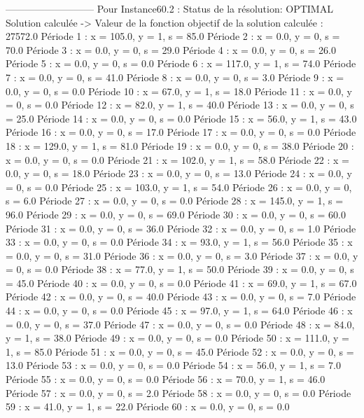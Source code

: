 ---------------------------
Pour Instance60.2  :
Status de la résolution: OPTIMAL
Solution calculée
-> Valeur de la fonction objectif de la solution calculée :  27572.0
Période 1 : x = 105.0, y = 1, s = 85.0
Période 2 : x = 0.0, y = 0, s = 70.0
Période 3 : x = 0.0, y = 0, s = 29.0
Période 4 : x = 0.0, y = 0, s = 26.0
Période 5 : x = 0.0, y = 0, s = 0.0
Période 6 : x = 117.0, y = 1, s = 74.0
Période 7 : x = 0.0, y = 0, s = 41.0
Période 8 : x = 0.0, y = 0, s = 3.0
Période 9 : x = 0.0, y = 0, s = 0.0
Période 10 : x = 67.0, y = 1, s = 18.0
Période 11 : x = 0.0, y = 0, s = 0.0
Période 12 : x = 82.0, y = 1, s = 40.0
Période 13 : x = 0.0, y = 0, s = 25.0
Période 14 : x = 0.0, y = 0, s = 0.0
Période 15 : x = 56.0, y = 1, s = 43.0
Période 16 : x = 0.0, y = 0, s = 17.0
Période 17 : x = 0.0, y = 0, s = 0.0
Période 18 : x = 129.0, y = 1, s = 81.0
Période 19 : x = 0.0, y = 0, s = 38.0
Période 20 : x = 0.0, y = 0, s = 0.0
Période 21 : x = 102.0, y = 1, s = 58.0
Période 22 : x = 0.0, y = 0, s = 18.0
Période 23 : x = 0.0, y = 0, s = 13.0
Période 24 : x = 0.0, y = 0, s = 0.0
Période 25 : x = 103.0, y = 1, s = 54.0
Période 26 : x = 0.0, y = 0, s = 6.0
Période 27 : x = 0.0, y = 0, s = 0.0
Période 28 : x = 145.0, y = 1, s = 96.0
Période 29 : x = 0.0, y = 0, s = 69.0
Période 30 : x = 0.0, y = 0, s = 60.0
Période 31 : x = 0.0, y = 0, s = 36.0
Période 32 : x = 0.0, y = 0, s = 1.0
Période 33 : x = 0.0, y = 0, s = 0.0
Période 34 : x = 93.0, y = 1, s = 56.0
Période 35 : x = 0.0, y = 0, s = 31.0
Période 36 : x = 0.0, y = 0, s = 3.0
Période 37 : x = 0.0, y = 0, s = 0.0
Période 38 : x = 77.0, y = 1, s = 50.0
Période 39 : x = 0.0, y = 0, s = 45.0
Période 40 : x = 0.0, y = 0, s = 0.0
Période 41 : x = 69.0, y = 1, s = 67.0
Période 42 : x = 0.0, y = 0, s = 40.0
Période 43 : x = 0.0, y = 0, s = 7.0
Période 44 : x = 0.0, y = 0, s = 0.0
Période 45 : x = 97.0, y = 1, s = 64.0
Période 46 : x = 0.0, y = 0, s = 37.0
Période 47 : x = 0.0, y = 0, s = 0.0
Période 48 : x = 84.0, y = 1, s = 38.0
Période 49 : x = 0.0, y = 0, s = 0.0
Période 50 : x = 111.0, y = 1, s = 85.0
Période 51 : x = 0.0, y = 0, s = 45.0
Période 52 : x = 0.0, y = 0, s = 13.0
Période 53 : x = 0.0, y = 0, s = 0.0
Période 54 : x = 56.0, y = 1, s = 7.0
Période 55 : x = 0.0, y = 0, s = 0.0
Période 56 : x = 70.0, y = 1, s = 46.0
Période 57 : x = 0.0, y = 0, s = 2.0
Période 58 : x = 0.0, y = 0, s = 0.0
Période 59 : x = 41.0, y = 1, s = 22.0
Période 60 : x = 0.0, y = 0, s = 0.0

